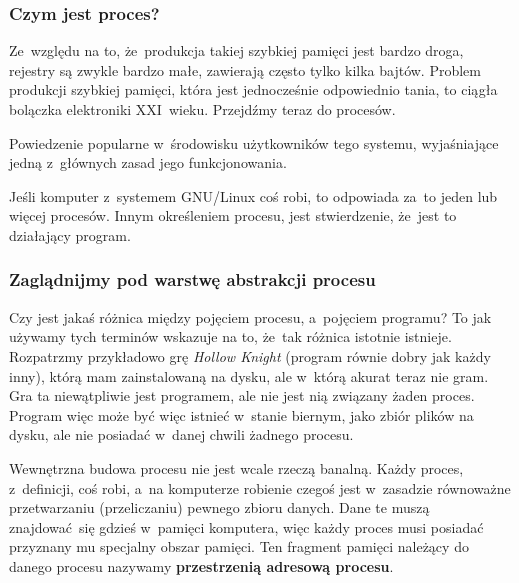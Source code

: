 \documentclass[10pt,t]{beamer}
\begin{document}
\begin{frame}
  \frametitle{Czym jest proces?}


  Ze~względu na to, że~produkcja takiej szybkiej pamięci jest bardzo droga,
  rejestry są zwykle bardzo małe, zawierają często tylko \alert{kilka}
  bajtów. Problem produkcji szybkiej pamięci, która jest jednocześnie
  odpowiednio tania, to ciągła bolączka elektroniki XXI~wieku. Przejdźmy
  teraz do procesów.

   Powiedzenie popularne w~środowisku
  użytkowników tego systemu, wyjaśniające jedną z~głównych zasad
  jego funkcjonowania.

  Jeśli
  komputer z~systemem GNU/Linux coś robi, to odpowiada za~to jeden lub
  więcej procesów. Innym określeniem procesu, jest stwierdzenie, że~jest
  to \alert{działający program}.

\end{frame}





\begin{frame}
  \frametitle{Zaglądnijmy pod warstwę abstrakcji procesu}


  Czy jest jakaś różnica między pojęciem procesu, a~pojęciem programu?
  To jak używamy tych terminów wskazuje na to, że~tak różnica istotnie
  istnieje. Rozpatrzmy przykładowo grę \textit{Hollow Knight} (program
  równie dobry jak każdy inny), którą mam zainstalowaną na dysku, ale
  w~którą akurat teraz nie gram. Gra ta niewątpliwie jest programem, ale
  nie jest nią związany żaden proces. Program więc może być więc istnieć
  w~stanie biernym, jako zbiór plików na dysku, ale nie posiadać w~danej
  chwili żadnego procesu.

  Wewnętrzna budowa procesu nie jest wcale rzeczą banalną. Każdy proces,
  z~definicji, coś robi, a~na komputerze robienie czegoś jest w~zasadzie
  równoważne przetwarzaniu (przeliczaniu) pewnego zbioru danych. Dane te
  muszą znajdować~się gdzieś w~pamięci komputera, więc każdy proces musi
  posiadać przyznany mu specjalny obszar pamięci. Ten fragment pamięci
  należący do danego procesu nazywamy \textbf{przestrzenią adresową
    procesu}.

\end{frame}
\end{document}
